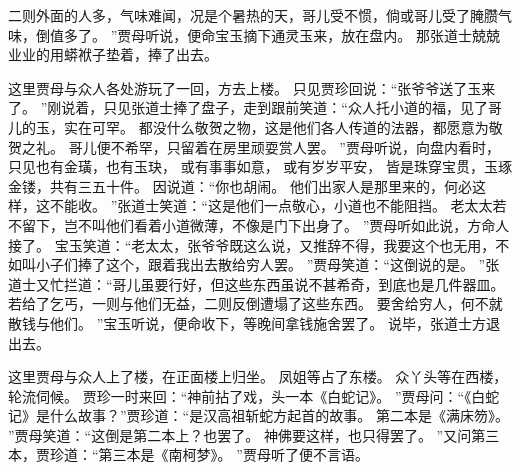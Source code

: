 二则外面的人多，气味难闻，况是个暑热的天，哥儿受不惯，倘或哥儿受了腌臜气味，倒值多了。
”贾母听说，便命宝玉摘下通灵玉来，放在盘内。
那张道士兢兢业业的用蟒袱子垫着，捧了出去。
\par
这里贾母与众人各处游玩了一回，方去上楼。
只见贾珍回说：“张爷爷送了玉来了。
”刚说着，只见张道士捧了盘子，走到跟前笑道：“众人托小道的福，见了哥儿的玉，实在可罕。
都没什么敬贺之物，这是他们各人传道的法器，都愿意为敬贺之礼。
哥儿便不希罕，只留着在房里顽耍赏人罢。
”贾母听说，向盘内看时，只见也有金璜，也有玉玦，
或有事事如意，
或有岁岁平安，
皆是珠穿宝贯，玉琢金镂，共有三五十件。
因说道：“你也胡闹。
他们出家人是那里来的，何必这样，这不能收。
”张道士笑道：“这是他们一点敬心，小道也不能阻挡。
老太太若不留下，岂不叫他们看着小道微薄，不像是门下出身了。
”贾母听如此说，方命人接了。
宝玉笑道：“老太太，张爷爷既这么说，又推辞不得，我要这个也无用，不如叫小子们捧了这个，跟着我出去散给穷人罢。
”贾母笑道：“这倒说的是。
”张道士又忙拦道：“哥儿虽要行好，但这些东西虽说不甚希奇，到底也是几件器皿。
若给了乞丐，一则与他们无益，二则反倒遭塌了这些东西。
要舍给穷人，何不就散钱与他们。
”宝玉听说，便命收下，等晚间拿钱施舍罢了。
说毕，张道士方退出去。
\par
这里贾母与众人上了楼，在正面楼上归坐。
凤姐等占了东楼。
众丫头等在西楼，轮流伺候。
贾珍一时来回：“神前拈了戏，头一本《白蛇记》。
”贾母问：“《白蛇记》是什么故事？”贾珍道：“是汉高祖斩蛇方起首的故事。
第二本是《满床笏》。
”贾母笑道：“这倒是第二本上？也罢了。
神佛要这样，也只得罢了。
”又问第三本，贾珍道：“第三本是《南柯梦》。
”贾母听了便不言语。
